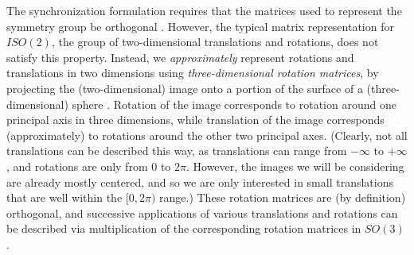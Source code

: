 \documentclass[12pt]{article}
\begin{document}
The synchronization formulation requires that the matrices used to represent the symmetry group be orthogonal \cite{singer2013spectral}.  
%
However, the typical matrix representation for $ISO(2)$, the group of two-dimensional translations and rotations, does not satisfy this property.
%
Instead, we {\it approximately} represent rotations and translations in two dimensions using {\it three-dimensional rotation matrices}, by projecting the (two-dimensional) image onto a portion of the surface of a (three-dimensional) sphere \cite{singer2011angular}.
%
Rotation of the image corresponds to rotation around one principal axis in three dimensions, while translation of the image corresponds (approximately) to rotations around the other two principal axes. (Clearly, not all translations can be described this way, as translations can range from $-\infty$ to $+ \infty$, and rotations are only from $0$ to $2 \pi$. However, the images we will be considering are already mostly centered, and so we are only interested in small translations that are well within the $[0, 2\pi)$ range.)
%
These rotation matrices are (by definition) orthogonal, and successive applications of various translations and rotations can be described via multiplication of the corresponding rotation matrices in $SO(3)$.
\end{document}
